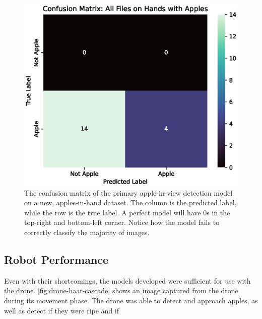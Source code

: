 \begin{figure}[!htb]
    \centering
    \includegraphics[width=\columnwidth,keepaspectratio]
    {./figures/confusion_matrix_All_Files_on_Hands_with_Apples}
    \caption{
        The confusion matrix of the primary apple-in-view detection model on a new, apples-in-hand dataset.
        The column is the predicted label, while the row is the true label.
        A perfect model will have 0s in the top-right and bottom-left corner.
        Notice how the model fails to correctly classify the majority of images.
    }
    \label{fig:apple-in-hand-confusion-matrix}
\end{figure}

\subsection{Robot Performance}\label{subsec:robot-performance}
Even with their shortcomings, the models developed were sufficient for use with the drone.
\autoref{fig:drone-haar-cascade} shows an image captured from the drone during its movement phase.
The drone was able to detect and approach apples, as well as detect if they were ripe and if 

